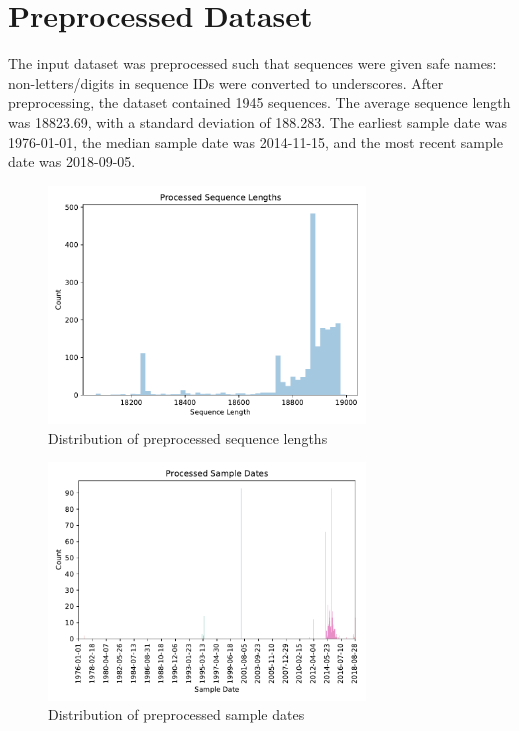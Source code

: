\documentclass{article}
\begin{document}
\section{Preprocessed Dataset}
The input dataset was preprocessed such that sequences were given safe names: non-letters/digits in sequence IDs were converted to underscores. After preprocessing, the dataset contained 1945 sequences. The average sequence length was 18823.69, with a standard deviation of 188.283. The earliest sample date was 1976-01-01, the median sample date was 2014-11-15, and the most recent sample date was 2018-09-05.

\begin{figure}[h]
\centering
\includegraphics[width=0.75\textwidth,keepaspectratio]{./figs/processed_sequence_lengths.pdf}
\caption{Distribution of preprocessed sequence lengths}
\end{figure}



\begin{figure}[h]
\centering
\includegraphics[width=0.75\textwidth,keepaspectratio]{./figs/processed_sample_dates.pdf}
\caption{Distribution of preprocessed sample dates}
\end{figure}
\end{document}
